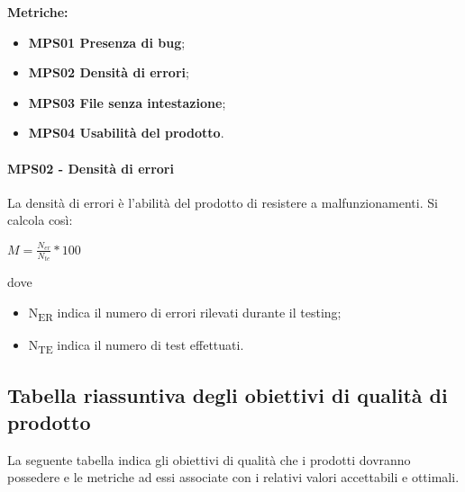 \documentclass[../piano_di_qualifica.tex]{subfiles}
\begin{document}
\textbf{Metriche:}
\smallbreak
\begin{itemize}
	\item \textbf{MPS01 Presenza di bug};
	\item \textbf{MPS02 Densità di errori};
	\item \textbf{MPS03 File senza intestazione};
	\item \textbf{MPS04 Usabilità del prodotto}.
\end{itemize}


\paragraph{MPS02 - Densità di errori}
La densità di errori è l'abilità del prodotto di resistere a malfunzionamenti. Si calcola così:\par

\begin{center}
	$M = \frac{N_{er}}{N_{te}} * 100$
\end{center}

dove
\smallbreak
\begin{itemize}
	\item N\textsubscript{ER} indica il numero di errori rilevati durante il testing;
	\item N\textsubscript{TE} indica il numero di test effettuati.
\end{itemize}

\subsection{Tabella riassuntiva degli obiettivi di qualità di prodotto}
La seguente tabella indica gli obiettivi di qualità che i prodotti dovranno possedere e le metriche ad essi associate con i relativi valori accettabili e ottimali. \\
\end{document}
